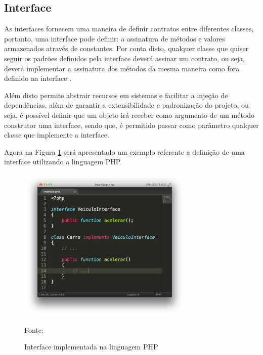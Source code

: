 \subsection{Interface}

As interfaces fornecem uma maneira de definir contratos entre diferentes
classes, portanto, uma interface pode definir: a assinatura de métodos e
valores armazenados através de constantes. Por conta disto, qualquer classe  que
quiser seguir os padrões definidos pela interface deverá assinar um contrato,
ou seja, deverá implementar a assinatura dos métodos da mesma maneira como  fora
definido na interface \cite{programmingPhp}.

Além disto permite abstrair recursos em sistemas e facilitar a
injeção de dependências, além de garantir a extensibilidade e padronização do
projeto, ou seja, é possível definir que um objeto irá receber como argumento de
um método construtor uma interface, sendo que, é permitido passar como parâmetro
qualquer classe que implemente a interface.

Agora na Figura \ref{fig:interface} será apresentado um exemplo referente a
definição de uma interface utilizando a linguagem \acs{PHP}.

\begin{figure}[h!tb]
	\caption{Interface implementada na linguagem PHP}
	\label{fig:interface}

	\centering
	\includegraphics[width=0.75\textwidth]{images/interface.png}

	\centering
	\footnotesize Fonte: \fonteOAutor
\end{figure}

\FloatBarrier 	%

